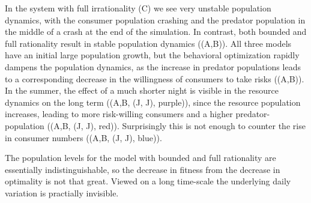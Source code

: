 In the system with full irrationality (C) we see very unstable population dynamics, with the consumer population crashing and the predator population in the middle of a crash at the end of the simulation. In contrast, both bounded and full rationality result in stable population dynamics ((A,B)). All three models have an initial large population growth, but the behavioral optimization rapidly dampens the population dynamics, as the increase in predator populations leads to a corresponding decrease in the willingness of consumers to take risks ((A,B)). In the summer, the effect of a much shorter night is visible in the resource dynamics on the long term ((A,B, (J, J), purple)), since the resource population increases, leading to more risk-willing consumers and a higher predator-population ((A,B, (J, J), red)). Surprisingly this is not enough to counter the rise in consumer numbers ((A,B, (J, J), blue)).

 The population levels for the model with bounded and full rationality are essentially indistinguishable, so the decrease in fitness from the decrease in optimality is not that great. Viewed on a long time-scale the underlying daily variation is practially invisible.

